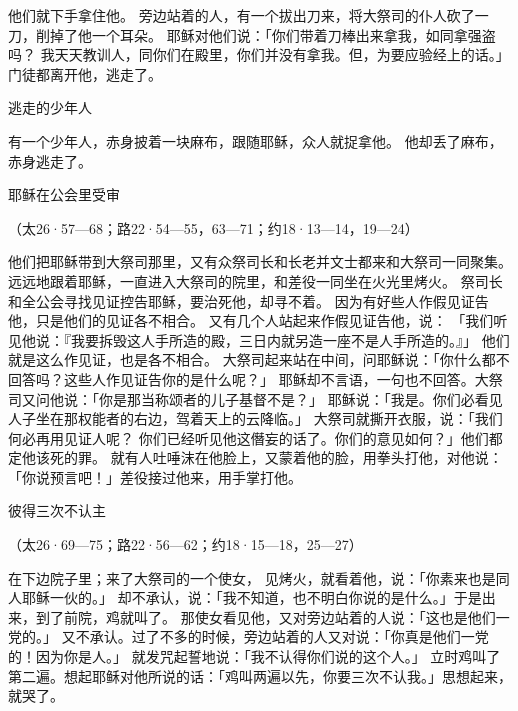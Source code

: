 {他们就下手拿住他。
旁边站着的人，有一个拔出刀来，将大祭司的仆人砍了一刀，削掉了他一个耳朵。
耶稣对他们说：「你们带着刀棒出来拿我，如同拿强盗吗？
我天天教训人，同你们在殿里，你们并没有拿我。但{}，为要应验经上的话。」
门徒都离开他，逃走了。
\par }{\SH 逃走的少年人
\par }{\PP {}有一个少年人，赤身披着一块麻布，跟随耶稣，众人就捉拿他。
他却丢了麻布，赤身逃走了。
\par }{\SH 耶稣在公会里受审
\par }{\R （太26·57—68；路22·54—55，63—71；约18·13—14，19—24）
\par }{\PP {}他们把耶稣带到大祭司那里，又有众祭司长和长老并文士都来和大祭司一同聚集。
远远地跟着耶稣，一直进入大祭司的院里，和差役一同坐在火光里烤火。
祭司长和全公会寻找见证控告耶稣，要治死他，却寻不着。
因为有好些人作假见证告他，只是他们的见证各不相合。
又有几个人站起来作假见证告他，说：
「我们听见他说：『我要拆毁这人手所造的殿，三日内就另造一座不是人手所造的。』」
他们就是这么作见证，也是各不相合。
大祭司起来站在中间，问耶稣说：「你什么都不回答吗？这些人作见证告你的是什么呢？」
耶稣却不言语，一句也不回答。大祭司又问他说：「你是那当称颂者的儿子基督不是？」
耶稣说：「我是。你们必看见人子坐在那权能者的右边，驾着天上的云降临。」
大祭司就撕开衣服，说：「我们何必再用见证人呢？
你们已经听见他这僭妄的话了。你们的意见如何？」他们都定他该死的罪。
就有人吐唾沫在他脸上，又蒙着他的脸，用拳头打他，对他说：「你说预言吧！」差役接过他来，用手掌打他。
\par }{\SH 彼得三次不认主
\par }{\R （太26·69—75；路22·56—62；约18·15—18，25—27）
\par }{\PP {}在下边院子里；来了大祭司的一个使女，
见{}烤火，就看着他，说：「你素来也是同{}人耶稣一伙的。」
却不承认，说：「我不知道，也不明白你说的是什么。」于是出来，到了前院，鸡就叫了。
那使女看见他，又对旁边站着的人说：「这也是他们一党的。」
又不承认。过了不多的时候，旁边站着的人又对{}说：「你真是他们一党的！因为你是{}人。」
就发咒起誓地说：「我不认得你们说的这个人。」
立时鸡叫了第二遍。{}想起耶稣对他所说的话：「鸡叫两遍以先，你要三次不认我。」思想起来，就哭了。

}
